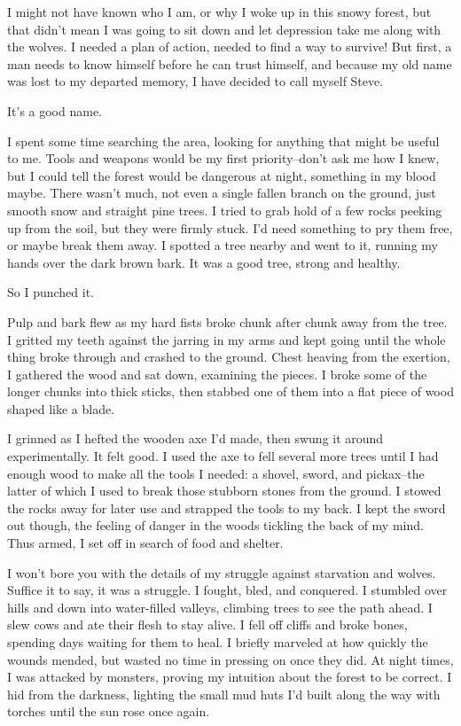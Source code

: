 \documentclass[]{book}
\begin{document}
I might not have known who I am, or why I woke up in this snowy forest,
but that didn't mean I was going to sit down and let depression take me
along with the wolves. I needed a plan of action, needed to find a way
to survive! But first, a man needs to know himself before he can trust
himself, and because my old name was lost to my departed memory, I have
decided to call myself Steve.

It's a good name.

I spent some time searching the area, looking for anything that might be
useful to me. Tools and weapons would be my first priority--don't ask me
how I knew, but I could tell the forest would be dangerous at night,
something in my blood maybe. There wasn't much, not even a single fallen
branch on the ground, just smooth snow and straight pine trees. I tried
to grab hold of a few rocks peeking up from the soil, but they were
firmly stuck. I'd need something to pry them free, or maybe break them
away. I spotted a tree nearby and went to it, running my hands over the
dark brown bark. It was a good tree, strong and healthy.

So I punched it.

Pulp and bark flew as my hard fists broke chunk after chunk away from
the tree. I gritted my teeth against the jarring in my arms and kept
going until the whole thing broke through and crashed to the ground.
Chest heaving from the exertion, I gathered the wood and sat down,
examining the pieces. I broke some of the longer chunks into thick
sticks, then stabbed one of them into a flat piece of wood shaped like a
blade.

I grinned as I hefted the wooden axe I'd made, then swung it around
experimentally. It felt good. I used the axe to fell several more trees
until I had enough wood to make all the tools I needed: a shovel, sword,
and pickax--the latter of which I used to break those stubborn stones
from the ground. I stowed the rocks away for later use and strapped the
tools to my back. I kept the sword out though, the feeling of danger in
the woods tickling the back of my mind. Thus armed, I set off in search
of food and shelter.

I won't bore you with the details of my struggle against starvation and
wolves. Suffice it to say, it was a struggle. I fought, bled, and
conquered. I stumbled over hills and down into water-filled valleys,
climbing trees to see the path ahead. I slew cows and ate their flesh to
stay alive. I fell off cliffs and broke bones, spending days waiting for
them to heal. I briefly marveled at how quickly the wounds mended, but
wasted no time in pressing on once they did. At night times, I was
attacked by monsters, proving my intuition about the forest to be
correct. I hid from the darkness, lighting the small mud huts I'd built
along the way with torches until the sun rose once again.
\end{document}

